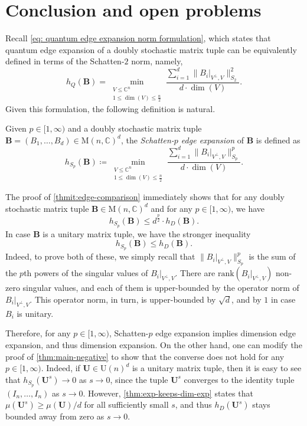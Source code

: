 \documentclass{toc}
\theoremstyle{plain}
\numberwithin{equation}{section}
\theoremstyle{definition}
\newcommand{\bC}{\mathbb{C}}
\newcommand{\rk}{\mathrm{rank}}
\newcommand{\norm}[1]{\lVert#1\rVert}
\newcommand{\M}{\mathrm{M}}
\newcommand{\U}{\mathrm{U}}
\newcommand{\tuple}[1]{\mathbf{#1}}
\newcommand{\vB}{\tuple{B}}
\newcommand{\vU}{\tuple{U}}
\begin{document}
\section{Conclusion and open problems}\label{sec:conclusion}
Recall \eqref{eq: quantum edge expansion norm formulation}, which states that quantum edge expansion of a doubly stochastic matrix tuple can be equivalently defined in terms of the Schatten-$2$ norm, namely, %
\[
    h_Q(\vB)=\min_{\substack{V \leq \bC^n\\1\leq\dim(V)\leq\frac{n}{2}}}\frac{\sum_{i=1}^d\norm{B_i|_{V^\perp,V}}_{S_2}^2}{d\cdot\dim(V)}.
\]
%
Given this formulation, the following definition is natural.
\begin{definition}
    Given $p \in [1,\infty)$ and a doubly stochastic matrix tuple $\vB=(B_1,\dots,B_d) \in \M(n,\bC)^d$, the \emph{Schatten-$p$ edge expansion} of $\vB$ is defined as
    \[
        h_{S_p}(\vB) \coloneqq \min_{\substack{V \leq \bC^n\\1\leq\dim(V)\leq\frac{n}{2}}}\frac{\sum_{i=1}^d\norm{B_i|_{V^\perp,V}}_{S_p}^p}{d\cdot\dim(V)}.
    \]
\end{definition}
The proof of \cref{thmit:edge-comparison} immediately shows that for any doubly stochastic matrix tuple $\vB \in \M(n,\bC)^d$ and for any $p \in [1,\infty)$, we have
\[
    h_{S_p}(\vB) \leq d^{\frac p2}\cdot h_D(\vB).
\]
In case $\vB$ is a unitary matrix tuple, we have the stronger inequality
\[
    h_{S_p}(\vB) \leq h_D(\vB).
\]
Indeed, to prove both of these, we simply recall that $\norm{B_i|_{V^\perp,V}}_{S_p}^p$ is the sum of the $p$th powers of the singular values of $B_i|_{V^\perp,V}$. There are $\rk(B_i|_{V^\perp,V})$ non-zero singular values, and each of them is upper-bounded by the operator norm of $B_i|_{V^\perp,V}$. This operator norm, in turn, is upper-bounded by $\sqrt d$, and by $1$ in case $B_i$ is unitary.

Therefore, for any $p \in [1,\infty)$, Schatten-$p$ edge expansion implies dimension edge expansion, and thus dimension expansion. On the other hand, one can modify the proof of \cref{thm:main-negative} to show that the converse does not hold for any $p \in [1,\infty)$. Indeed, if $\vU \in \U(n)^d$ is a unitary matrix tuple, then it is easy to see that $h_{S_p}(\vU^s) \to 0$ as $s \to 0$, since the tuple $\vU^s$ converges to the identity tuple $(I_n,\dots,I_n)$ as $s \to 0$. However, \cref{thm:exp-keeps-dim-exp} states that $\mu(\vU^s)\geq \mu(\vU)/d$ for all sufficiently small $s$, and thus $h_D(\vU^s)$ stays bounded away from zero as $s \to 0$.
\end{document}
